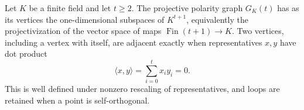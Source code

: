 \begin{definition}
Let $K$ be a finite field and let $t\geq2$.  The projective polarity graph
$G_K(t)$ has as its vertices the one-dimensional subspaces of
$K^{t+1}$, equivalently the projectivization of the vector space of maps
$\operatorname{Fin}(t+1)\to K$.  Two vertices, including a vertex with
itself, are adjacent exactly when representatives $x,y$ have dot product
\[
 \langle x,y\rangle=\sum_{i=0}^{t}x_i y_i=0.
\]
This is well defined under nonzero rescaling of representatives, and loops
are retained when a point is self-orthogonal.
\end{definition}
